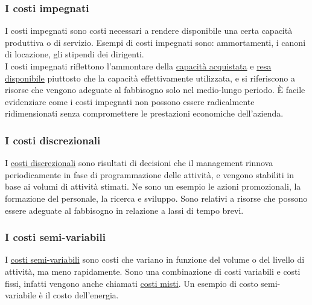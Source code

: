\documentclass{article}
\begin{document}
\subsubsection*{I costi impegnati}
I costi impegnati sono costi necessari a rendere disponibile una certa capacità produttiva o di servizio. Esempi di costi impegnati sono: ammortamenti, i canoni di locazione, gli stipendi dei dirigenti.
\vspace*{0.1cm}\\
I costi impegnati riflettono l'ammontare della \underline{capacità acquistata} e \underline{resa disponibile} piuttosto che la capacità effettivamente utilizzata, e si riferiscono a risorse che vengono adeguate al fabbisogno solo nel medio-lungo periodo. È facile evidenziare come i costi impegnati non possono essere radicalmente ridimensionati senza compromettere le prestazioni economiche dell'azienda.
\vspace*{0.1cm}\\


\subsubsection*{I costi discrezionali}
I \underline{costi discrezionali} sono risultati di decisioni che il management rinnova periodicamente in fase di programmazione delle attività, e vengono stabiliti in base ai volumi di attività stimati. Ne sono un esempio le azioni promozionali, la formazione del personale, la ricerca e sviluppo. Sono relativi a risorse che possono essere adeguate al fabbisogno in relazione a lassi di tempo brevi.


\subsubsection{I costi semi-variabili}
I \underline{costi semi-variabili} sono costi che variano in funzione del volume o del livello di attività, ma meno rapidamente. Sono una combinazione di costi variabili e costi fissi, infatti vengono anche chiamati \underline{costi misti}. Un esempio di costo semi-variabile è il costo dell'energia.
\end{document}
